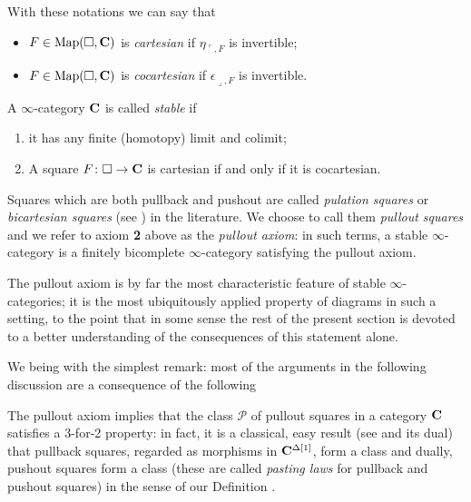 With these notations we can say that
\begin{itemize}
\item $F\in \text{Map}(\square, \mathbf{C})$ is \emph{cartesian} if $\eta_{\ulcorner, F}$ is invertible;
\item $F\in \text{Map}(\square, \mathbf{C})$ is \emph{cocartesian} if $\epsilon_{\lrcorner, F}$ is invertible.
\end{itemize}
\begin{definition}\label{def:stablequasi}
A $\infty$\hyp{}category $\mathbf{C}$ is called \emph{stable} if
\begin{enumerate}
\item it has any finite (homotopy) limit and colimit;
\item A square $F\colon\square \to \mathbf{C}$ is cartesian if and only if it is cocartesian.
\end{enumerate}
\end{definition}
\begin{notat}\label{pullout.axiom}
Squares which are both pullback and pushout are called \emph{pulation squares} or \emph{bicartesian squares} (see \cite[Def. \textbf{11.32}]{acc}) in the literature.
We choose to call them \emph{pullout squares} and we refer to axiom \textbf{2} above as the \emph{pullout axiom}: in such terms, a stable $\infty$\hyp{}category is a finitely bicomplete $\infty$\hyp{}category satisfying the pullout axiom.
\end{notat}
\begin{remark}
The pullout axiom is by far the most characteristic feature of stable $\infty$\hyp{}categories; it is the most ubiquitously applied property of diagrams in such a setting, to the point that in some sense the rest of the present section is devoted to a better understanding of the consequences of this statement alone.
\end{remark}
We being with the simplest remark: most of the arguments in the following discussion are a consequence of the following
\begin{remark}\label{a.3.for.2}
The pullout axiom implies that the class $\mathcal P$ of pullout squares in a category $\mathbf{C}$ satisfies a 3\hyp{}for\hyp{}2 property: in fact, it is a classical, easy result (see \cite[Prop. \textbf{11.10}]{acc} and its dual) that pullback squares, regarded as morphisms in $\mathbf{C}^{\Delta[1]}$, form a  class and dually, pushout squares form a  class (these are called \emph{pasting laws} for pullback and pushout squares) in the sense of our Definition .
\end{remark}
